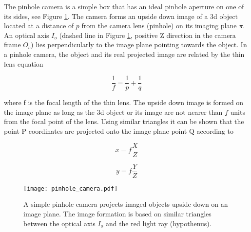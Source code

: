 \documentclass[12pt,a4paper,oneside,pdftex]{report}
\begin{document}
{%

The pinhole camera is a simple box that has an ideal pinhole aperture on one of its sides, see Figure \ref{fig:pinhole_camera}. The camera forms an upside down image of a 3d object located at a distance of $p$ from the camera lens (pinhole) on its imaging plane $\pi$. An optical axis $I_o$ (dashed line in Figure \ref{fig:pinhole_camera}, positive Z direction in the camera frame $O_c$) lies perpendicularly to the image plane pointing towards the object. In a pinhole camera, the object and its real projected image are related by the thin lens equation

\begin{equation}
\frac{1}{f} = \frac{1}{p} + \frac{1}{q}
\label{eq:lens_law}
\end{equation}

where f is the focal length of the thin lens. The upside down image is formed on the image plane as long as the 3d object or its image are not nearer than $f$ units from the focal point of the lens. Using similar triangles it can be shown that the point P coordinates are projected onto the image plane point Q according to

\begin{equation}
x = f\frac{X}{Z}
\label{eq:image_projection}
\end{equation}

\begin{equation}
y = f\frac{Y}{Z}
\label{eq:image_projection2}
\end{equation}

\begin{figure}[ht]
  \begin{center}
    \texttt{[image: pinhole\_camera.pdf]}
    \caption{A simple pinhole camera projects imaged objects upside down on an image plane. The image formation is based on similar triangles between the optical axis $I_o$ and the red light ray (hypothenus).}
    \label{fig:pinhole_camera}
  \end{center}
\end{figure}

}
\end{document}
